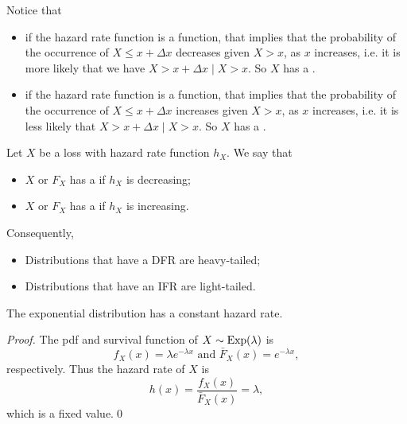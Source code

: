 \documentclass[notoc,notitlepage]{tufte-book}
\begin{document}
Notice that
\begin{itemize}
  \item if the hazard rate function is a  function, that implies that the probability of the occurrence of $X \leq x + \Delta x$ decreases given $X > x$, as $x$ increases, i.e. it is more likely that we have $X > x + \Delta x \mid X > x$. So $X$ has a .
  \item if the hazard rate function is a  function, that implies that the probability of the occurrence of $X \leq x + \Delta x$ increases given $X > x$, as $x$ increases, i.e. it is less likely that $X > x + \Delta x \mid X > x$. So $X$ has a .
\end{itemize}

\begin{defn}\label{defn:decreasing_and_increasing_failure_rates}
  Let $X$ be a loss with hazard rate function $h_X$. We say that
  \begin{itemize}
    \item $X$ or $F_X$ has a  if $h_X$ is decreasing;
    \item $X$ or $F_X$ has a  if $h_X$ is increasing.
  \end{itemize}
\end{defn}

\begin{note}
  Consequently,
  \begin{itemize}
    \item Distributions that have a DFR are heavy-tailed;
    \item Distributions that have an IFR are light-tailed.
  \end{itemize}
\end{note}

\begin{propo}\label{propo:exponential_has_constant_hazard_rate}
  The exponential distribution has a constant hazard rate.
\end{propo}

\begin{proof}
  The pdf and survival function of $X \sim \operatorname{Exp}(\lambda)$ is
  \begin{equation*}
    f_X(x) = \lambda e^{-\lambda x} \text{ and } \bar{F}_X(x) = e^{-\lambda x},
  \end{equation*}
  respectively. Thus the hazard rate of $X$ is
  \begin{equation*}
    h(x) = \frac{f_X(x)}{\bar{F}_X(x)} = \lambda,
  \end{equation*}
  which is a fixed value.\qed\
\end{proof}
\end{document}
